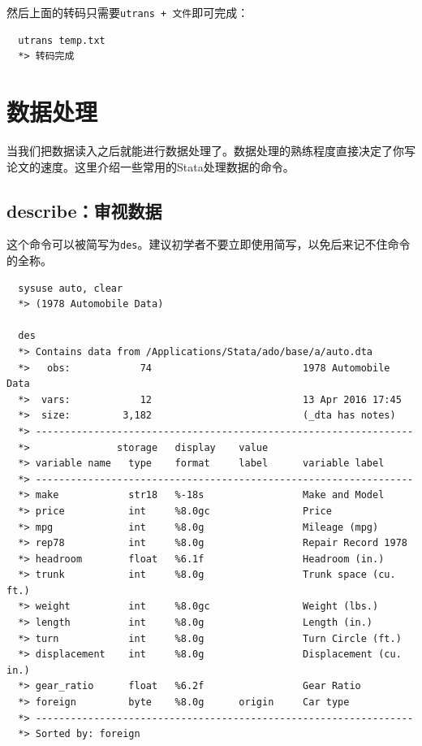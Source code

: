 \documentclass[cn,fancy,blue,11pt]{elegantbook}
\begin{document}
然后上面的转码只需要\lstinline{utrans + 文件}即可完成：

\begin{lstlisting}
  utrans temp.txt
  *> 转码完成
\end{lstlisting}

\section{数据处理}

当我们把数据读入之后就能进行数据处理了。数据处理的熟练程度直接决定了你写论文的速度。这里介绍一些常用的Stata处理数据的命令。

\subsection{describe：审视数据}

这个命令可以被简写为\texttt{des}。建议初学者不要立即使用简写，以免后来记不住命令的全称。

\begin{lstlisting}
  sysuse auto, clear
  *> (1978 Automobile Data)

  des
  *> Contains data from /Applications/Stata/ado/base/a/auto.dta
  *>   obs:            74                          1978 Automobile Data
  *>  vars:            12                          13 Apr 2016 17:45
  *>  size:         3,182                          (_dta has notes)
  *> -----------------------------------------------------------------
  *>               storage   display    value
  *> variable name   type    format     label      variable label
  *> -----------------------------------------------------------------
  *> make            str18   %-18s                 Make and Model
  *> price           int     %8.0gc                Price
  *> mpg             int     %8.0g                 Mileage (mpg)
  *> rep78           int     %8.0g                 Repair Record 1978
  *> headroom        float   %6.1f                 Headroom (in.)
  *> trunk           int     %8.0g                 Trunk space (cu. ft.)
  *> weight          int     %8.0gc                Weight (lbs.)
  *> length          int     %8.0g                 Length (in.)
  *> turn            int     %8.0g                 Turn Circle (ft.)
  *> displacement    int     %8.0g                 Displacement (cu. in.)
  *> gear_ratio      float   %6.2f                 Gear Ratio
  *> foreign         byte    %8.0g      origin     Car type
  *> -----------------------------------------------------------------
  *> Sorted by: foreign
\end{lstlisting}
\end{document}
